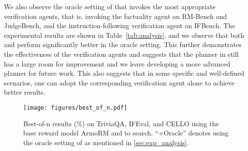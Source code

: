 We also observe the oracle setting of \ourmethod that invokes the most appropriate verification agents, that is, invoking the factuality agent on RM-Bench and JudgeBench, and the instruction-following verification agent on IFBench. The experimental results are shown in Table~\ref{tab:analysis}, and we observe that both \ourmethodmini and \ourmethodllama perform significantly better in the oracle setting. This further demonstrates the effectiveness of the verification agents and suggests that the planner in \ourmethod still has a large room for improvement and we leave developing a more advanced planner for future work. This also suggests that in some specific and well-defined scenarios, one can adopt the corresponding verification agent alone to achieve better results.

\begin{figure*}
    \centering
    \texttt{[image: figures/best\_of\_n.pdf]}
    \caption{Best-of-n results (\%) on TriviaQA, IFEval, and CELLO using the base reward model ArmoRM and \ourmethod to search. ``+Oracle'' denotes using the oracle setting of \ourmethod as mentioned in \cref{sec:exp_analysis}.}
    \label{fig:enter-label}
\end{figure*}


